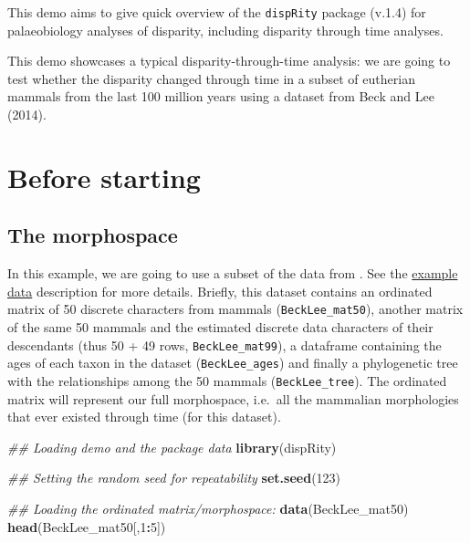 \documentclass[]{book}
\newenvironment{Shaded}{\begin{snugshade}}{\end{snugshade}}
\newcommand{\CommentTok}[1]{\textcolor[rgb]{0.56,0.35,0.01}{\textit{#1}}}
\newcommand{\DecValTok}[1]{\textcolor[rgb]{0.00,0.00,0.81}{#1}}
\newcommand{\KeywordTok}[1]{\textcolor[rgb]{0.13,0.29,0.53}{\textbf{#1}}}
\newcommand{\NormalTok}[1]{#1}
\newcommand{\OperatorTok}[1]{\textcolor[rgb]{0.81,0.36,0.00}{\textbf{#1}}}
\begin{document}
This demo aims to give quick overview of the \texttt{dispRity} package (v.1.4) for palaeobiology analyses of disparity, including disparity through time analyses.

This demo showcases a typical disparity-through-time analysis: we are going to test whether the disparity changed through time in a subset of eutherian mammals from the last 100 million years using a dataset from Beck and Lee (2014).

\hypertarget{before-starting}{%
\section{Before starting}\label{before-starting}}

\hypertarget{the-morphospace}{%
\subsection{The morphospace}\label{the-morphospace}}

In this example, we are going to use a subset of the data from \citet{beckancient2014}.
See the \protect\hyperlink{example-data}{example data} description for more details.
Briefly, this dataset contains an ordinated matrix of 50 discrete characters from mammals (\texttt{BeckLee\_mat50}), another matrix of the same 50 mammals and the estimated discrete data characters of their descendants (thus 50 + 49 rows, \texttt{BeckLee\_mat99}), a dataframe containing the ages of each taxon in the dataset (\texttt{BeckLee\_ages}) and finally a phylogenetic tree with the relationships among the 50 mammals (\texttt{BeckLee\_tree}).
The ordinated matrix will represent our full morphospace, i.e.~all the mammalian morphologies that ever existed through time (for this dataset).

\begin{Shaded}
\begin{Highlighting}[]
\CommentTok{## Loading demo and the package data}
\KeywordTok{library}\NormalTok{(dispRity)}

\CommentTok{## Setting the random seed for repeatability}
\KeywordTok{set.seed}\NormalTok{(}\DecValTok{123}\NormalTok{)}

\CommentTok{## Loading the ordinated matrix/morphospace:}
\KeywordTok{data}\NormalTok{(BeckLee_mat50)}
\KeywordTok{head}\NormalTok{(BeckLee_mat50[,}\DecValTok{1}\OperatorTok{:}\DecValTok{5}\NormalTok{])}
\end{Highlighting}
\end{Shaded}
\end{document}
